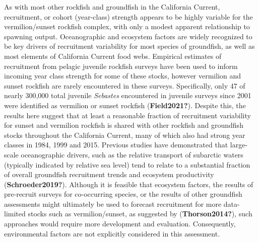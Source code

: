 \documentclass[11pt,
  english,
  a4paper,
]{article}
\begin{document}
\leavevmode\tagmcend\tagstructend\par


As with most other rockfish and groundfish in the California Current, recruitment, or cohort (year-class) strength appears to be highly variable for the vermilion/sunset rockfish complex, with only a modest apparent relationship to spawning output. Oceanographic and ecosystem factors are widely recognized to be key drivers of recruitment variability for most species of groundfish, as well as most elements of California Current food webs. Empirical estimates of recruitment from pelagic juvenile rockfish surveys have been used to inform incoming year class strength for some of these stocks, however vermilion and sunset rockfish are rarely encountered in these surveys. Specifically, only 47 of nearly 300,000 total juvenile \emph{Sebastes} encountered in juvenile surveys since 2001 were identified as vermilion or sunset rockfish {(\textbf{Field2021?})\leavevmode\tagmcend\tagstructend}. Despite this, the results here suggest that at least a reasonable fraction of recruitment variability for sunset and vermilion rockfish is shared with other rockfish and groundfish stocks throughout the California Current, many of which also had strong year classes in 1984, 1999 and 2015. Previous studies have demonstrated that large-scale oceanographic drivers, such as the relative transport of subarctic waters (typically indicated by relative sea level) tend to relate to a substantial fraction of overall groundfish recruitment trends and ecosystem productivity {(\textbf{Schroeder2019?})\leavevmode\tagmcend\tagstructend}. Although it is feasible that ecosystem factors, the results of pre-recruit surveys for co-occurring species, or the results of other groundfish assessments might ultimately be used to forecast recruitment for more data-limited stocks such as vermilion/sunset, as suggested by {(\textbf{Thorson2014?})\leavevmode\tagmcend\tagstructend}, such approaches would require more development and evaluation. Consequently, environmental factors are not explicitly considered in this assessment.

\leavevmode\tagmcend\tagstructend\par

\end{document}
